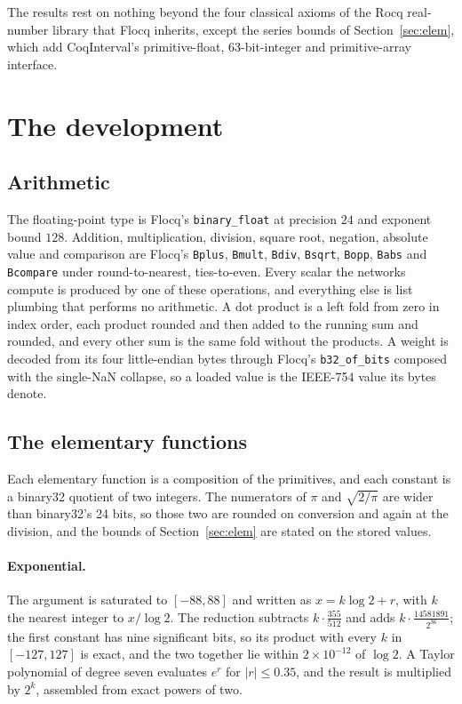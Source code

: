 \documentclass[11pt]{article}
\theoremstyle{plain}
\theoremstyle{definition}
\newcommand{\code}[1]{\texttt{#1}}
\begin{document}
The results rest on nothing beyond the four classical axioms of the Rocq
real-number library that Flocq inherits, except the series bounds of
Section~\ref{sec:elem}, which add CoqInterval's primitive-float, 63-bit-integer
and primitive-array interface.

\section{The development}
\label{sec:dev}

\subsection{Arithmetic}

The floating-point type is Flocq's \code{binary\_float} at precision $24$ and
exponent bound $128$. Addition, multiplication, division, square root,
negation, absolute value and comparison are Flocq's \code{Bplus}, \code{Bmult},
\code{Bdiv}, \code{Bsqrt}, \code{Bopp}, \code{Babs} and \code{Bcompare} under
round-to-nearest, ties-to-even. Every scalar the networks compute is produced
by one of these operations, and everything else is list plumbing that performs
no arithmetic. A dot product is a left fold from zero in index order, each
product rounded and then added to the running sum and rounded, and every other
sum is the same fold without the products. A weight is decoded from its four little-endian bytes through
Flocq's \code{b32\_of\_bits} composed with the single-NaN collapse, so a loaded
value is the IEEE-754 value its bytes denote.

\subsection{The elementary functions}

Each elementary function is a composition of the primitives, and each constant
is a binary32 quotient of two integers. The numerators of $\pi$ and
$\sqrt{2/\pi}$ are wider than binary32's 24 bits, so those two are rounded on
conversion and again at the division, and the bounds of
Section~\ref{sec:elem} are stated on the stored values.

\paragraph{Exponential.} The argument is saturated to $[-88, 88]$ and written
as $x = k\log 2 + r$, with $k$ the nearest integer to $x/\log 2$. The reduction
subtracts $k\cdot\frac{355}{512}$ and adds $k\cdot\frac{14581891}{2^{36}}$; the
first constant has nine significant bits, so its product with every $k$ in
$[-127, 127]$ is exact, and the two together lie within $2\times10^{-12}$ of
$\log 2$. A Taylor polynomial of degree seven evaluates $e^r$ for
$|r|\le 0.35$, and the result is multiplied by $2^k$, assembled from exact
powers of two.
\end{document}
